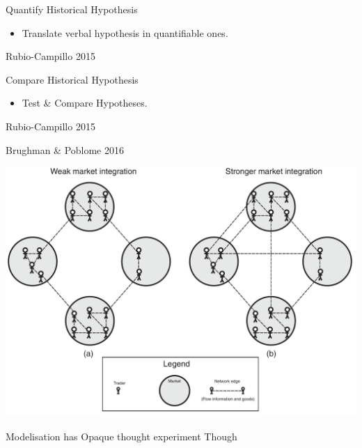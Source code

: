 \documentclass[12pt, notes=show]{beamer}
\begin{document}
\begin{frame}{Quantify Historical Hypothesis}
	\begin{itemize}
		\item Translate verbal hypothesis in quantifiable ones.
	\end{itemize}

Rubio-Campillo 2015

	
\end{frame}

\begin{frame}{Compare Historical Hypothesis}
	\begin{itemize}
		\item Test \& Compare Hypotheses.
	\end{itemize}

Rubio-Campillo 2015

	
\end{frame}

\begin{frame}
	Brughman \& Poblome 2016
	\begin{center}
	    \includegraphics[width=.8\textwidth]{images/marketIntegration.png}
	\end{center}
\end{frame}


\begin{frame}
	Modelisation has Opaque thought experiment Though 
\end{frame}
\end{document}
